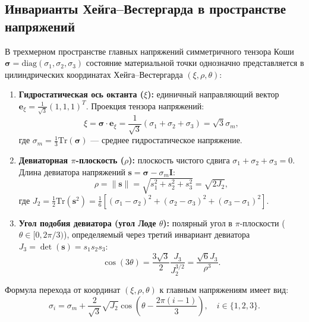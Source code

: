 \documentclass[11pt,a4paper]{article}
\theoremstyle{definition}
\theoremstyle{remark}
\begin{document}
\subsection{Инварианты Хейга--Вестергарда в пространстве напряжений}
В трехмерном пространстве главных напряжений симметричного тензора Коши $\boldsymbol{\sigma} = \mathrm{diag}(\sigma_1, \sigma_2, \sigma_3)$ состояние материальной точки однозначно представляется в цилиндрических координатах Хейга--Вестергарда $(\xi, \rho, \theta)$:
\begin{enumerate}
    \item \textbf{Гидростатическая ось октанта ($\xi$):} единичный направляющий вектор $\mathbf{e}_\xi = \frac{1}{\sqrt{3}}(1, 1, 1)^T$. Проекция тензора напряжений:
    \begin{equation}
        \xi = \boldsymbol{\sigma} \cdot \mathbf{e}_\xi = \frac{1}{\sqrt{3}}(\sigma_1 + \sigma_2 + \sigma_3) = \sqrt{3} \sigma_m,
    \end{equation}
    где $\sigma_m = \frac{1}{3}\mathrm{Tr}(\boldsymbol{\sigma})$ --- среднее гидростатическое напряжение.
    
    \item \textbf{Девиаторная $\pi$-плоскость ($\rho$):} плоскость чистого сдвига $\sigma_1 + \sigma_2 + \sigma_3 = 0$. Длина девиатора напряжений $\mathbf{s} = \boldsymbol{\sigma} - \sigma_m \mathbf{I}$:
    \begin{equation}
        \rho = \|\mathbf{s}\| = \sqrt{s_1^2 + s_2^2 + s_3^2} = \sqrt{2 J_2},
    \end{equation}
    где $J_2 = \frac{1}{2}\mathrm{Tr}(\mathbf{s}^2) = \frac{1}{6}\left[ (\sigma_1 - \sigma_2)^2 + (\sigma_2 - \sigma_3)^2 + (\sigma_3 - \sigma_1)^2 \right]$.
    
    \item \textbf{Угол подобия девиатора (угол Лоде $\theta$):} полярный угол в $\pi$-плоскости ($\theta \in [0, 2\pi/3)$), определяемый через третий инвариант девиатора $J_3 = \det(\mathbf{s}) = s_1 s_2 s_3$:
    \begin{equation}
        \cos(3\theta) = \frac{3\sqrt{3}}{2} \frac{J_3}{J_2^{3/2}} = \frac{\sqrt{6} J_3}{\rho^3}.
    \end{equation}
\end{enumerate}

Формула перехода от координат $(\xi, \rho, \theta)$ к главным напряжениям имеет вид:
\begin{equation}
    \sigma_i = \sigma_m + \frac{2}{\sqrt{3}} \sqrt{J_2} \cos\left( \theta - \frac{2\pi(i-1)}{3} \right), \quad i \in \{1, 2, 3\}.
    \label{eq:sigma_hw}
\end{equation}
\end{document}
